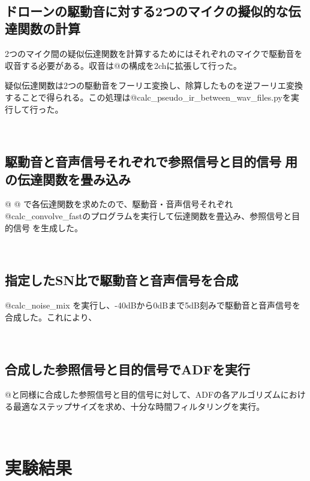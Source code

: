\
\subsection{ドローンの駆動音に対する2つのマイクの擬似的な伝達関数の計算}\label{ux30c9ux30edux30fcux30f3ux306eux99c6ux52d5ux97f3ux306bux5bfeux3059ux308b2ux3064ux306eux30deux30a4ux30afux306eux64ecux4f3cux7684ux306aux4f1dux9054ux95a2ux6570ux306eux8a08ux7b97}

2つのマイク間の疑似伝達関数を計算するためにはそれぞれのマイクで駆動音を収音する必要がある。収音は@の構成を2chに拡張して行った。

疑似伝達関数は2つの駆動音をフーリエ変換し、除算したものを逆フーリエ変換することで得られる。この処理は@calc\_pseudo\_ir\_between\_wav\_files.pyを実行して行った。

\
\subsection{駆動音と音声信号それぞれで参照信号と目的信号用の伝達関数を畳み込み}\label{ux99c6ux52d5ux97f3ux3068ux97f3ux58f0ux4fe1ux53f7ux305dux308cux305eux308cux3067ux53c2ux7167ux4fe1ux53f7ux3068ux76eeux7684ux4fe1ux53f7ux7528ux306eux4f1dux9054ux95a2ux6570ux3092ux7573ux307fux8fbcux307f}

@ @
で各伝達関数を求めたので、駆動音・音声信号それぞれ@calc\_convolve\_fastのプログラムを実行して伝達関数を畳込み、参照信号と目的信号を生成した。

\
\subsection{指定したSN比で駆動音と音声信号を合成}\label{ux6307ux5b9aux3057ux305fsnux6bd4ux3067ux99c6ux52d5ux97f3ux3068ux97f3ux58f0ux4fe1ux53f7ux3092ux5408ux6210}

@calc\_noise\_mix
を実行し、-40dBから0dBまで5dB刻みで駆動音と音声信号を合成した。これにより、

\
\subsection{合成した参照信号と目的信号でADFを実行}\label{ux5408ux6210ux3057ux305fux53c2ux7167ux4fe1ux53f7ux3068ux76eeux7684ux4fe1ux53f7ux3067adfux3092ux5b9fux884c}

@と同様に合成した参照信号と目的信号に対して、ADFの各アルゴリズムにおける最適なステップサイズを求め、十分な時間フィルタリングを実行。

\
\section{実験結果}\label{ux5b9fux9a13ux7d50ux679c}

